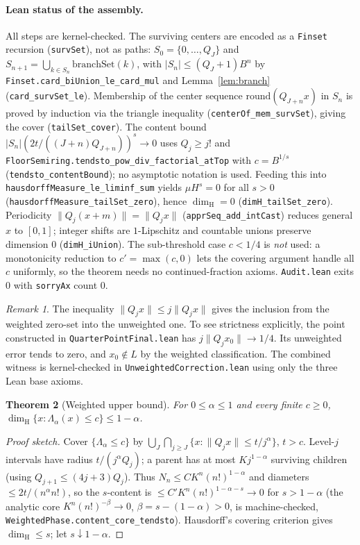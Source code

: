 \documentclass[11pt]{article}
\newtheorem{theorem}{Theorem}
\theoremstyle{definition}
\theoremstyle{remark}
\newtheorem{remark}[theorem]{Remark}
\newcommand{\dimH}{\dim_{\mathrm{H}}}
\newcommand{\Lam}{\Lambda}
\begin{document}
\paragraph{Lean status of the assembly.} All steps are kernel-checked.
The surviving centers are encoded as a \texttt{Finset} recursion
(\texttt{survSet}), not as paths: $S_0=\{0,\dots,Q_J\}$ and
$S_{n+1}=\bigcup_{k\in S_n}\mathrm{branchSet}(k)$, with
$|S_n|\le(Q_J+1)B^n$ by \texttt{Finset.card\_biUnion\_le\_card\_mul} and
Lemma~\ref{lem:branch} (\texttt{card\_survSet\_le}). Membership of the center
sequence $\mathrm{round}(Q_{J+n}x)$ in $S_n$ is proved by induction via the
triangle inequality (\texttt{centerOf\_mem\_survSet}), giving the cover
(\texttt{tailSet\_cover}). The content bound
$|S_n|(2t/((J+n)Q_{J+n}))^s\to0$ uses $Q_j\ge j!$ and
\texttt{FloorSemiring.tendsto\_pow\_div\_factorial\_atTop} with $c=B^{1/s}$
(\texttt{tendsto\_contentBound}); no asymptotic notation is used. Feeding this
into \texttt{hausdorffMeasure\_le\_liminf\_sum} yields $\mu H^s=0$ for all
$s>0$ (\texttt{hausdorffMeasure\_tailSet\_zero}), hence $\dimH=0$
(\texttt{dimH\_tailSet\_zero}). Periodicity
$\|Q_j(x+m)\|=\|Q_jx\|$ (\texttt{apprSeq\_add\_intCast}) reduces general $x$ to
$[0,1]$; integer shifts are $1$-Lipschitz and countable unions preserve
dimension $0$ (\texttt{dimH\_iUnion}). The sub-threshold case $c<1/4$ is
\emph{not} used: a monotonicity reduction to $c'=\max(c,0)$ lets the covering
argument handle all $c$ uniformly, so the theorem needs no continued-fraction
axioms. \texttt{Audit.lean} exits $0$ with \texttt{sorryAx} count $0$.

\begin{remark}
The inequality $\|Q_jx\|\le j\|Q_jx\|$ gives the inclusion from the
weighted zero-set into the unweighted one. To see strictness explicitly,
the point constructed in \texttt{QuarterPointFinal.lean} has
$j\|Q_jx_0\|\to1/4$. Its unweighted error tends to zero, and
$x_0\notin L$ by the weighted classification. The combined witness is kernel-checked in \texttt{UnweightedCorrection.lean} using only the three Lean base axioms.
\end{remark}

\begin{theorem}[Weighted upper bound]\label{thm:upper}
For $0\le\alpha\le1$ and every finite $c\ge0$,
$\dimH\{x:\Lam_\alpha(x)\le c\}\le1-\alpha$.
\end{theorem}
\begin{proof}[Proof sketch]
Cover $\{\Lam_\alpha\le c\}$ by $\bigcup_J\bigcap_{j\ge J}\{x:\|Q_jx\|\le t/j^\alpha\}$,
$t>c$. Level-$j$ intervals have radius $t/(j^\alpha Q_j)$; a parent has at most
$K j^{1-\alpha}$ surviving children (using $Q_{j+1}\le(4j+3)Q_j$). Thus
$N_n\le C K^n (n!)^{1-\alpha}$ and diameters $\le2t/(n^\alpha n!)$, so the
$s$-content is $\le C' K^n (n!)^{1-\alpha-s}\to0$ for $s>1-\alpha$
(the analytic core $K^n(n!)^{-\beta}\to0$, $\beta=s-(1-\alpha)>0$, is
machine-checked, \texttt{WeightedPhase.content\_core\_tendsto}). Hausdorff's
covering criterion gives $\dimH\le s$; let $s\downarrow1-\alpha$.
\end{proof}
\end{document}
